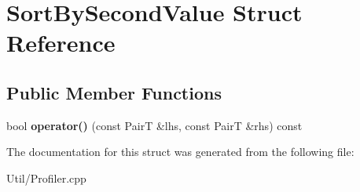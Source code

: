 \hypertarget{struct_sort_by_second_value}{
\section{\-Sort\-By\-Second\-Value \-Struct \-Reference}
\label{struct_sort_by_second_value}
}
\subsection*{\-Public \-Member \-Functions}
\begin{DoxyCompactItemize}
\item 
\hypertarget{struct_sort_by_second_value_a5364782c2f3e94a449c71b24f1af5676}{
bool {\bfseries operator()} (const \-Pair\-T \&lhs, const \-Pair\-T \&rhs) const }
\label{struct_sort_by_second_value_a5364782c2f3e94a449c71b24f1af5676}

\end{DoxyCompactItemize}


\-The documentation for this struct was generated from the following file\-:\begin{DoxyCompactItemize}
\item 
\-Util/\-Profiler.\-cpp\end{DoxyCompactItemize}
